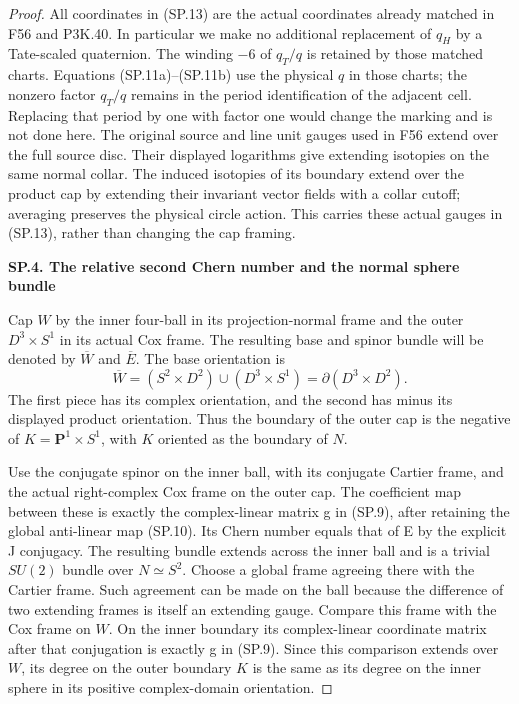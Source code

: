 \begin{proof}
All coordinates in (SP.13) are the actual coordinates already
matched in F56 and P3K.40. In particular we make no additional
replacement of \(q_H\) by a Tate-scaled quaternion. The winding
\(-6\) of \(q_T/q\) is retained by those matched charts.
Equations (SP.11a)--(SP.11b) use the physical \(q\) in those
charts; the nonzero factor \(q_T/q\) remains in the period
identification of the adjacent cell. Replacing that period by one
with factor one would change the marking and is not done here.
The original source and line unit gauges used in F56 extend over
the full source disc. Their displayed logarithms give extending
isotopies on the same normal collar. The induced isotopies of its
boundary extend over the product cap by extending their invariant
vector fields with a collar cutoff; averaging preserves the
physical circle action. This carries these actual gauges in
(SP.13), rather than changing the cap framing.

\par

\medskip\noindent\textbf{SP.4. The relative second Chern number and the normal sphere bundle}

\par\nobreak

Cap \(W\) by the inner four-ball in its projection-normal frame
and the outer \(D^3\times S^1\) in its actual Cox frame. The
resulting base and spinor bundle will be denoted by
\(\overline W\) and \(\overline E\). The base orientation is
\[
 \overline W=(S^2\times D^2)\cup(D^3\times S^1)
                      =\partial(D^3\times D^2).
                                                               \tag{SP.15}
\]
The first piece has its complex orientation, and the second has
minus its displayed product orientation. Thus the boundary of the
outer cap is the negative of
\(K=\mathbf P^1\times S^1\), with \(K\) oriented as the
boundary of \(N\).

Use the conjugate spinor on the inner ball, with its conjugate Cartier
frame, and the actual right-complex Cox frame on the outer cap.
The coefficient map between these is exactly the complex-linear matrix
g in (SP.9), after retaining the global anti-linear map (SP.10).
Its Chern number equals that of E by the explicit J conjugacy.
The resulting bundle extends across the inner ball and is a trivial
\(SU(2)\) bundle over \(N\simeq S^2\). Choose a global frame
agreeing there with the Cartier frame. Such agreement can be made
on the ball because the difference of two extending frames is
itself an extending gauge. Compare this frame with the Cox frame on
\(W\). On the inner boundary its complex-linear coordinate matrix after
that conjugation is exactly g in (SP.9).
Since this comparison extends over \(W\), its degree on the outer
boundary \(K\) is the same as its degree on the inner sphere in
its positive complex-domain orientation.


\end{proof}
